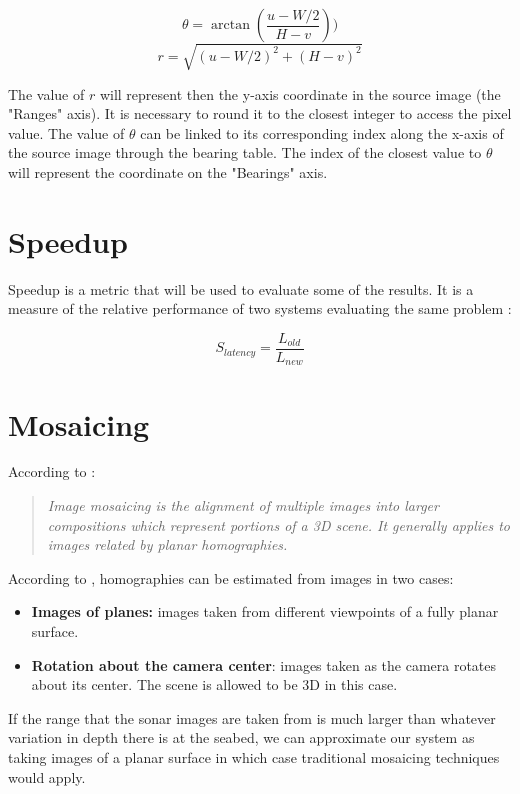 \[
\theta = \arctan(\frac{u - W / 2}{ H - v}))
\]
\[
r = \sqrt{(u - W / 2) ^ 2 + (H - v)^ 2}
\]

The value of \(r\) will represent then the y-axis coordinate in the source image (the "Ranges" axis). It is necessary to round it to the closest integer to access the pixel value. The value of \(\theta\) can be linked to its corresponding index along the x-axis of the source image through the bearing table. The index of the closest value to \(\theta\) will represent the coordinate on the "Bearings" axis.

\section{Speedup}
\label{sec:speedup}

Speedup is a metric that will be used to evaluate some of the results. It is a measure of the relative performance of two systems evaluating the same problem \cite{enwiki:1225834080}:

\[S_{latency} = \frac{L_{old}}{L_{new}}\]


\section{Mosaicing}
\label{sec:mosaicing}


According to \citeauthor{Capel2001}\cite{Capel2001}:
\begin{quote}
\textit{Image mosaicing is the alignment of multiple images into larger compositions which represent portions of a 3D scene. It generally applies to images related by planar homographies.}
\end{quote}

According to \citeauthor{Capel2001}, homographies can be estimated from images in two cases:
\begin{itemize}
    \item \textbf{Images of planes:} images taken from different viewpoints of a fully planar surface.
    \item \textbf{Rotation about the camera center}: images taken as the camera rotates about its center. The scene is allowed to be 3D in this case.
\end{itemize}

If the range that the sonar images are taken from is much larger than whatever variation in depth there is at the seabed, we can approximate our system as taking images of a planar surface in which case traditional mosaicing techniques would apply. 

